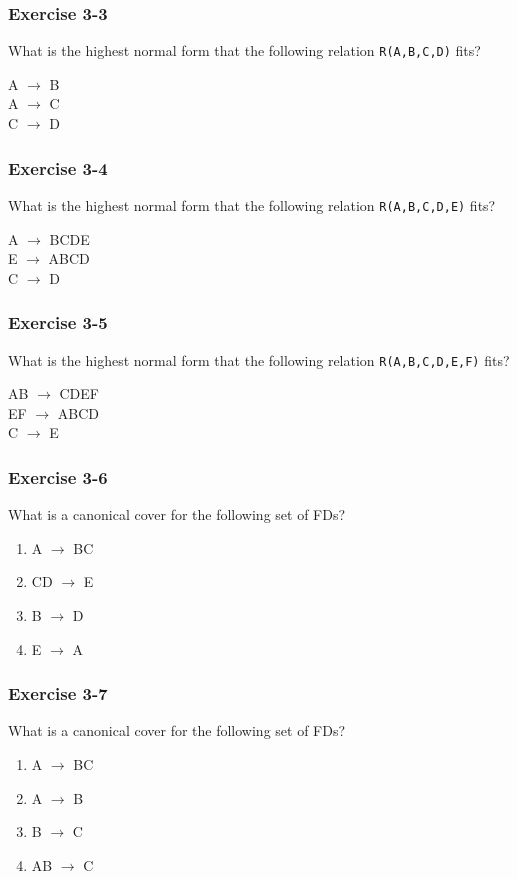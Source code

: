 \begin{frame}
\frametitle{Exercise 3-3}

What is the highest normal form that the following relation \texttt{R(A,B,C,D)} fits?

A $\rightarrow$ B \\
A $\rightarrow$ C \\
C $\rightarrow$ D

\end{frame}


\begin{frame}
\frametitle{Exercise 3-4}

What is the highest normal form that the following relation \texttt{R(A,B,C,D,E)} fits?

A $\rightarrow$ BCDE \\
E $\rightarrow$ ABCD \\
C $\rightarrow$ D

\end{frame}


\begin{frame}
\frametitle{Exercise 3-5}

What is the highest normal form that the following relation \texttt{R(A,B,C,D,E,F)} fits?

AB $\rightarrow$ CDEF \\
EF $\rightarrow$ ABCD \\
C $\rightarrow$ E

\end{frame}


\begin{frame}
\frametitle{Exercise 3-6}

What is a canonical cover for the following set of FDs?

\begin{enumerate}
  \item A $\rightarrow$ BC
  \item CD $\rightarrow$ E
  \item B $\rightarrow$ D
  \item E $\rightarrow$ A
\end{enumerate}

\end{frame}


\begin{frame}
\frametitle{Exercise 3-7}

What is a canonical cover for the following set of FDs?

\begin{enumerate}
  \item A $\rightarrow$ BC
  \item A $\rightarrow$ B
  \item B $\rightarrow$ C
  \item AB $\rightarrow$ C
\end{enumerate}

\end{frame}

